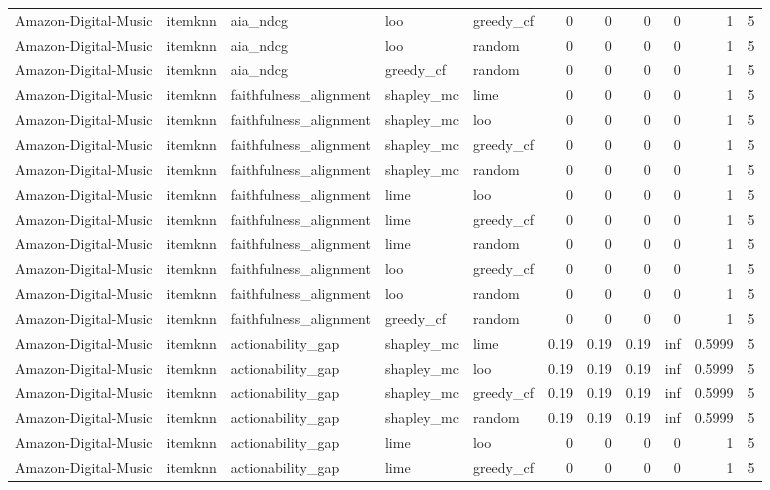 \begin{table}[t]
{\begin{tabular}{lllllrrrrrr}
Amazon-Digital-Music & itemknn & aia\_ndcg & loo & greedy\_cf & 0 & 0 & 0 & 0 & 1 & 5 \\
Amazon-Digital-Music & itemknn & aia\_ndcg & loo & random & 0 & 0 & 0 & 0 & 1 & 5 \\
Amazon-Digital-Music & itemknn & aia\_ndcg & greedy\_cf & random & 0 & 0 & 0 & 0 & 1 & 5 \\
Amazon-Digital-Music & itemknn & faithfulness\_alignment & shapley\_mc & lime & 0 & 0 & 0 & 0 & 1 & 5 \\
Amazon-Digital-Music & itemknn & faithfulness\_alignment & shapley\_mc & loo & 0 & 0 & 0 & 0 & 1 & 5 \\
Amazon-Digital-Music & itemknn & faithfulness\_alignment & shapley\_mc & greedy\_cf & 0 & 0 & 0 & 0 & 1 & 5 \\
Amazon-Digital-Music & itemknn & faithfulness\_alignment & shapley\_mc & random & 0 & 0 & 0 & 0 & 1 & 5 \\
Amazon-Digital-Music & itemknn & faithfulness\_alignment & lime & loo & 0 & 0 & 0 & 0 & 1 & 5 \\
Amazon-Digital-Music & itemknn & faithfulness\_alignment & lime & greedy\_cf & 0 & 0 & 0 & 0 & 1 & 5 \\
Amazon-Digital-Music & itemknn & faithfulness\_alignment & lime & random & 0 & 0 & 0 & 0 & 1 & 5 \\
Amazon-Digital-Music & itemknn & faithfulness\_alignment & loo & greedy\_cf & 0 & 0 & 0 & 0 & 1 & 5 \\
Amazon-Digital-Music & itemknn & faithfulness\_alignment & loo & random & 0 & 0 & 0 & 0 & 1 & 5 \\
Amazon-Digital-Music & itemknn & faithfulness\_alignment & greedy\_cf & random & 0 & 0 & 0 & 0 & 1 & 5 \\
Amazon-Digital-Music & itemknn & actionability\_gap & shapley\_mc & lime & 0.19 & 0.19 & 0.19 & inf & 0.5999 & 5 \\
Amazon-Digital-Music & itemknn & actionability\_gap & shapley\_mc & loo & 0.19 & 0.19 & 0.19 & inf & 0.5999 & 5 \\
Amazon-Digital-Music & itemknn & actionability\_gap & shapley\_mc & greedy\_cf & 0.19 & 0.19 & 0.19 & inf & 0.5999 & 5 \\
Amazon-Digital-Music & itemknn & actionability\_gap & shapley\_mc & random & 0.19 & 0.19 & 0.19 & inf & 0.5999 & 5 \\
Amazon-Digital-Music & itemknn & actionability\_gap & lime & loo & 0 & 0 & 0 & 0 & 1 & 5 \\
Amazon-Digital-Music & itemknn & actionability\_gap & lime & greedy\_cf & 0 & 0 & 0 & 0 & 1 & 5 \\

\end{tabular}}
\end{table}
